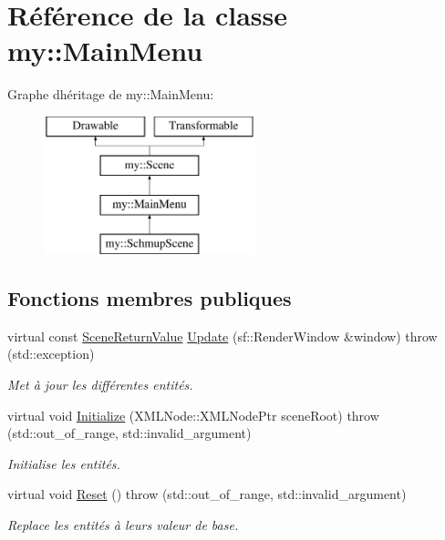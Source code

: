 \hypertarget{classmy_1_1MainMenu}{}\section{Référence de la classe my\+:\+:Main\+Menu}
\label{classmy_1_1MainMenu}
Graphe d\textquotesingle{}héritage de my\+:\+:Main\+Menu\+:\begin{figure}[H]
\begin{center}
\leavevmode
\includegraphics[height=4.000000cm]{classmy_1_1MainMenu}
\end{center}
\end{figure}
\subsection*{Fonctions membres publiques}
\begin{DoxyCompactItemize}
\item 
virtual const \hyperlink{structmy_1_1SceneReturnValue}{Scene\+Return\+Value} \hyperlink{classmy_1_1MainMenu_ada39ad2f51014f08e4526056967daf47}{Update} (sf\+::\+Render\+Window \&window)  throw (std\+::exception)
\begin{DoxyCompactList}\small\item\em Met à jour les différentes entités. \end{DoxyCompactList}\item 
virtual void \hyperlink{classmy_1_1MainMenu_a56e81061a8d8d9a0da77267bd38ec058}{Initialize} (X\+M\+L\+Node\+::\+X\+M\+L\+Node\+Ptr scene\+Root)  throw (std\+::out\+\_\+of\+\_\+range, std\+::invalid\+\_\+argument)
\begin{DoxyCompactList}\small\item\em Initialise les entités. \end{DoxyCompactList}\item 
\mbox{\label{classmy_1_1MainMenu_aace3282e435e32542dd3d6ee9bb76ea2}} 
virtual void \hyperlink{classmy_1_1MainMenu_aace3282e435e32542dd3d6ee9bb76ea2}{Reset} ()  throw (std\+::out\+\_\+of\+\_\+range, std\+::invalid\+\_\+argument)
\begin{DoxyCompactList}\small\item\em Replace les entités à leurs valeur de base. \end{DoxyCompactList}\end{DoxyCompactItemize}
